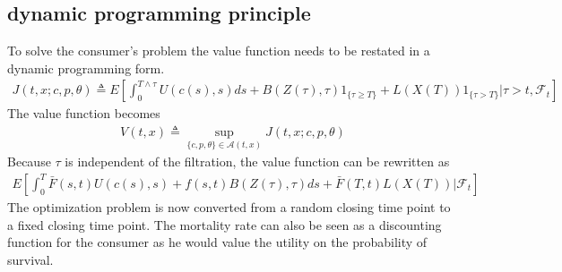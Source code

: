 \documentclass[letterpaper,10pt,english]{jupyterBook}
\begin{document}
\subsection{dynamic programming principle}
\label{\detokenize{Financial_application:dynamic-programming-principle}}
\sphinxAtStartPar
To solve the consumer’s problem the value function needs to be restated in a dynamic programming form.
\begin{equation*}
\begin{split}J(t, x; c, p, \theta) \triangleq E \left[\int_0^{T \wedge \tau} U(c(s),s)ds + B(Z(\tau),\tau)1_{\{\tau \ge T\}} + L(X(T))1_{\{\tau>T\}}| \tau> t, \mathcal{F}_t \right] \end{split}
\end{equation*}
\sphinxAtStartPar
The value function becomes
\begin{equation*}
\begin{split} V(t,x) \triangleq \sup_{\{c,p,\theta\} \in \mathcal{A}(t,x)} J(t, x; c, p, \theta)  \end{split}
\end{equation*}
\sphinxAtStartPar
Because \(\tau\) is independent of the filtration, the value function can be rewritten as
\begin{equation*}
\begin{split} E \left[\int_0^T  \bar{F}(s,t)U(c(s),s) + f(s,t)B(Z(\tau),\tau) ds  + \bar{F}(T,t)L(X(T))| \mathcal{F}_t \right]\end{split}
\end{equation*}
\sphinxAtStartPar
The optimization problem is now converted from a random  closing time point to a fixed closing time point. The mortality rate can also be seen as a discounting function for the consumer as he would value the utility on the probability of survival.
\end{document}
